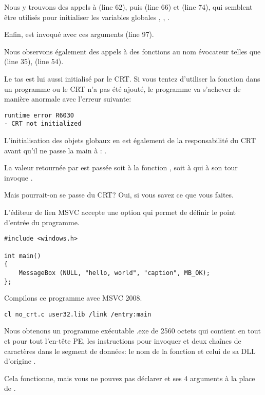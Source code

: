 Nous y trouvons des appels à  (line 62),
puis  (line 66) et  (line 74),
qui semblent être utilisés pour initialiser les variables globales
, , .

Enfin, \main{} est invoqué avec ces arguments (line 97).

Nous observons également des appels à des fonctions au nom évocateur telles que 
(line 35),  (line 54).

Le tas  est lui aussi initialisé par le \ac{CRT}.
Si vous tentez d'utiliser la fonction  dans un programme ou le CRT n'a pas été ajouté,
le programme va s'achever de manière anormale avec l'erreur suivante:

\begin{lstlisting}
runtime error R6030
- CRT not initialized
\end{lstlisting}

L'initialisation des objets globaux en \Cpp est également de la responsabilité du \ac{CRT} avant
qu'il ne passe la main à \main{}:
.

La valeur retournée par \main{} est passée soit à la fonction , soit à  qui
à son tour invoque .

Mais pourrait-on se passe du \ac{CRT}?
Oui, si vous savez ce que vous faites.

L'éditeur de lien \ac{MSVC} accepte une option  qui permet de définir le point d'entrée
du programme.

\begin{lstlisting}[style=customc]
#include <windows.h>

int main()
{
	MessageBox (NULL, "hello, world", "caption", MB_OK);
};
\end{lstlisting}

Compilons ce programme avec MSVC 2008.

\begin{lstlisting}
cl no_crt.c user32.lib /link /entry:main
\end{lstlisting}

Nous obtenons un programme exécutable .exe de 2560 octets qui contient en tout et pour tout l'en-tête
PE, les  instructions pour invoquer  et deux chaînes de caractères dans le segment de
données:  le nom de la fonction  et celui de sa DLL d'origine .

Cela fonctionne, mais vous ne pouvez pas déclarer  et ses 4 arguments à la place de
\main{}.

